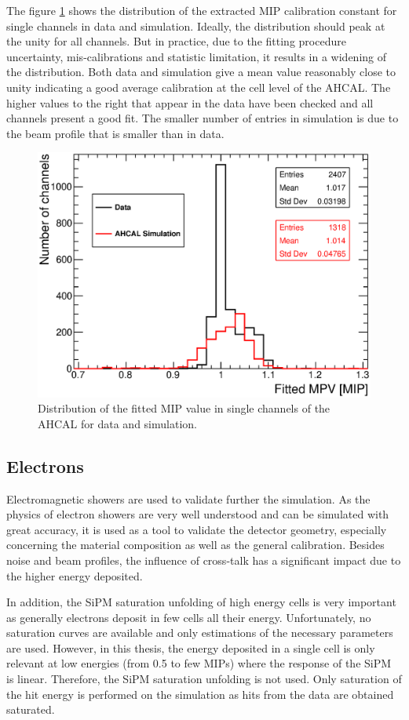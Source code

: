 The figure \ref{fig:MPVData_MC} shows the distribution of the extracted MIP calibration constant for single channels in data and simulation. Ideally, the distribution should peak at the unity for all channels. But in practice, due to the fitting procedure uncertainty, mis-calibrations and statistic limitation, it results in a widening of the distribution. Both data and simulation give a mean value reasonably close to unity indicating a good average calibration at the cell level of the AHCAL. The higher values to the right that appear in the data have been checked and all channels present a good fit. The smaller number of entries in simulation is due to the beam profile that is smaller than in data.

\begin{figure}[htbp!]
	\centering
	\includegraphics[width=0.6\linewidth]{../Thesis_Plots/EnergyCalib/Plots/ComparisonMCData_MPV.eps}
	\caption{Distribution of the fitted MIP value in single channels of the AHCAL for data and simulation.} \label{fig:MPVData_MC}
\end{figure}

\subsection{Electrons}

Electromagnetic showers are used to validate further the simulation. As the physics of electron showers are very well understood and can be simulated with great accuracy, it is used as a tool to validate the detector geometry, especially concerning the material composition as well as the general calibration. Besides noise and beam profiles, the influence of cross-talk has a significant impact due to the higher energy deposited.

In addition, the SiPM saturation unfolding of high energy cells is very important as generally electrons deposit in few cells all their energy. Unfortunately, no saturation curves are available and only estimations of the necessary parameters are used. However, in this thesis, the energy deposited in a single cell is only relevant at low energies (from 0.5 to few MIPs) where the response of the SiPM is linear. Therefore, the SiPM saturation unfolding is not used. Only saturation of the hit energy is performed on the simulation as hits from the data are obtained saturated.

